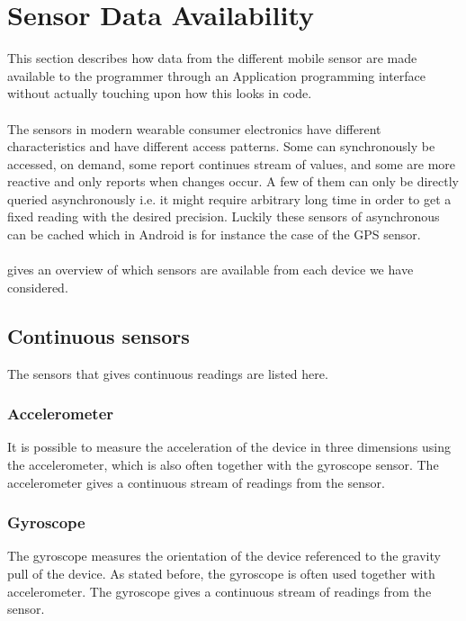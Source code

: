 
\section{Sensor Data Availability}
\label{sec:sensor_data_availability}

This section describes how data from the different mobile sensor are made available to the programmer through an Application programming interface without actually touching upon how this looks in code. 
\\\\
The sensors in modern wearable consumer electronics have different characteristics and have different access patterns. Some can synchronously be accessed, on demand, some report continues stream of values, and some are more reactive and only reports when changes occur. A few of them can only be directly queried asynchronously i.e. it might require arbitrary long time in order to get a fixed reading with the desired precision. Luckily these sensors of asynchronous can be cached which in Android is for instance the case of the GPS sensor. 
\\\\
 gives an overview of which sensors are available from each device we have considered.
\\


\subsection{Continuous sensors}
\label{sub:continuous_sensors}
The sensors that gives continuous readings are listed here.

\subsubsection{Accelerometer}
\label{sub:accelerometer}
It is possible to measure the acceleration of the device in three dimensions using the accelerometer, which is also often together with the gyroscope sensor. The accelerometer gives a continuous stream of readings from the sensor.

\subsubsection{Gyroscope}
\label{sub:gyroscope}
The gyroscope measures the orientation of the device referenced to the gravity pull of the device. As stated before, the gyroscope is often used together with accelerometer. The gyroscope gives a continuous stream of readings from the sensor.


